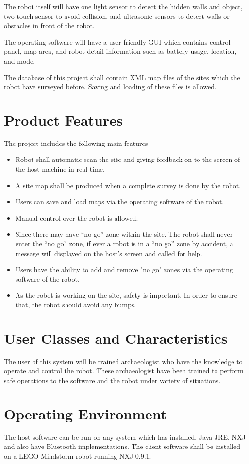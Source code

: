 \documentclass[11pt, a4paper]{report}
\begin{document}
The robot itself will have one light sensor to detect the hidden walls and object, two touch sensor to avoid collision, and ultrasonic sensors to detect walls or obstacles in front of the robot. 

The operating software will have a user friendly GUI which contains control panel, map area, and robot detail information such as battery usage, location, and mode. 

The database of this project shall contain XML map files of the sites which the robot have surveyed before. Saving and loading of these files is allowed. 

\section{Product Features}
The project includes the following main features
\begin{itemize}
\item Robot shall automatic scan the site and giving feedback on to the screen of the host machine in real time. 
\item A site map shall be produced when a complete survey is done by the robot.
\item Users can save and load maps via the operating software of the robot. 
\item Manual control over the robot is allowed. 
\item Since there may have “no go” zone within the site. The robot shall never enter the “no go” zone, if ever a robot is in a “no go” zone by accident, a message will displayed on the host's screen and called for help.
\item Users have the ability to add and remove "no go" zones via the operating software of the robot.
\item As the robot is working on the site, safety is important. In order to ensure that, the robot should avoid any bumps.
\end{itemize}

\section{User Classes and Characteristics}
The user of this system will be trained archaeologist who have the knowledge to operate and control the robot. These archaeologist have been trained to perform safe operations to the software and the robot under variety of situations.

\section{Operating Environment}
The host software can be run on any system which has installed, Java JRE, NXJ and also have Bluetooth implementations.
The client software shall be installed on a LEGO\textregistered{} Mindstorm\textregistered{} robot running NXJ 0.9.1.
\end{document}
